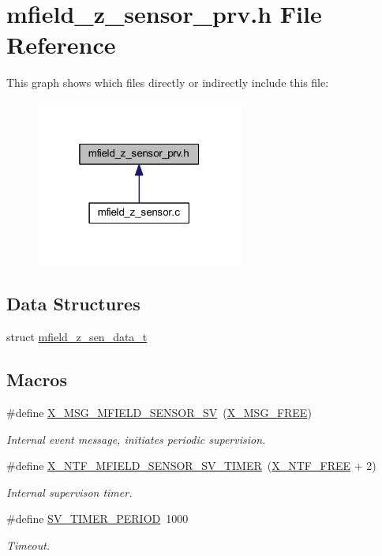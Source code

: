 \hypertarget{a00027}{\section{mfield\+\_\+z\+\_\+sensor\+\_\+prv.\+h File Reference}
\label{a00027}
}
This graph shows which files directly or indirectly include this file\+:\nopagebreak
\begin{figure}[H]
\begin{center}
\leavevmode
\includegraphics[width=193pt]{d0/daf/a00970}
\end{center}
\end{figure}
\subsection*{Data Structures}
\begin{DoxyCompactItemize}
\item 
struct \hyperlink{a00027_d8/dbd/a00597}{mfield\+\_\+z\+\_\+sen\+\_\+data\+\_\+t}
\end{DoxyCompactItemize}
\subsection*{Macros}
\begin{DoxyCompactItemize}
\item 
\#define \hyperlink{a00027_a510020575747f82c587c5485b8619f78}{X\+\_\+\+M\+S\+G\+\_\+\+M\+F\+I\+E\+L\+D\+\_\+\+S\+E\+N\+S\+O\+R\+\_\+\+S\+V}~(\hyperlink{a00036_a082eb6e82ded25b00f04da4f611c961e}{X\+\_\+\+M\+S\+G\+\_\+\+F\+R\+E\+E})
\begin{DoxyCompactList}\small\item\em Internal event message, initiates periodic supervision. \end{DoxyCompactList}\item 
\#define \hyperlink{a00027_ad9eede821e7c65d58f1806af4bd6bf29}{X\+\_\+\+N\+T\+F\+\_\+\+M\+F\+I\+E\+L\+D\+\_\+\+S\+E\+N\+S\+O\+R\+\_\+\+S\+V\+\_\+\+T\+I\+M\+E\+R}~(\hyperlink{a00036_ab2eeea4643823a0c7c7731ddb83e3edc}{X\+\_\+\+N\+T\+F\+\_\+\+F\+R\+E\+E} + 2)
\begin{DoxyCompactList}\small\item\em Internal supervison timer. \end{DoxyCompactList}\item 
\#define \hyperlink{a00027_a8a535456285f4602701c814d7b69cc68}{S\+V\+\_\+\+T\+I\+M\+E\+R\+\_\+\+P\+E\+R\+I\+O\+D}~1000
\begin{DoxyCompactList}\small\item\em Timeout. \end{DoxyCompactList}\end{DoxyCompactItemize}
